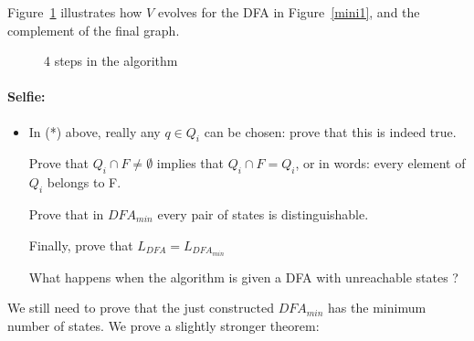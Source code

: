 Figure~\ref{minim1} illustrates how $V$ evolves for the DFA in
Figure~\ref{mini1}, and the complement of the final graph.
\begin{figure}[h]
\caption{ 4 steps in the algorithm\label{minim1}}
\end{figure}
\paragraph{Selfie:}
\begin{itemize}
\item[]
In (*) above, really any $q \in Q_i$ can be chosen: prove that this is
indeed true.

Prove that $Q_i \cap F \neq \emptyset$ implies that $Q_i \cap F =
Q_i$, or in words: every element of $Q_i$ belongs to F.

Prove that in $DFA_{min}$ every pair of states is distinguishable.

Finally, prove that $L_{DFA} = L_{DFA_{min}}$

What happens when the algorithm is given a DFA with unreachable states
?
\end{itemize}


We still need to prove that the just constructed $DFA_{min}$ has the
minimum number of states. We prove a slightly stronger theorem:

